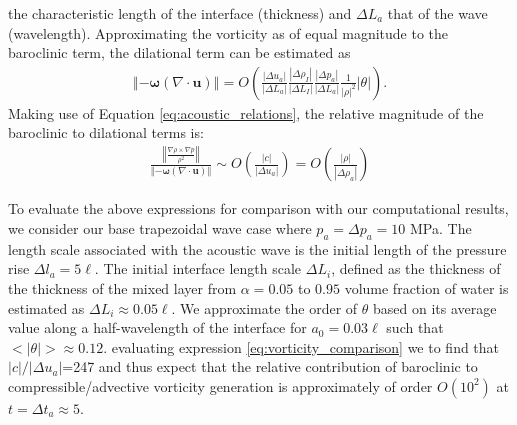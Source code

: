 \documentclass{jfm}%
\newcommand{\orderof}[1]{\ensuremath{\textit{O}\left(#1\right)}}
\newcommand{\abs}[1]{\ensuremath{\left|#1\right|}}
\newcommand{\norm}[1]{\ensuremath{\left\Vert#1\right\Vert}}
\begin{document}
the characteristic length of the interface (thickness) and
$\Delta L_a$ that of the wave (wavelength). Approximating the
vorticity as of equal magnitude to the baroclinic term, the dilational
term can be estimated as
\begin{align}
  \label{eq:compressible_advective_vorticity}%
  \norm{-\boldsymbol{\omega}\left(\nabla\cdot\boldsymbol{u}\right)} = %
  \orderof{%
  \frac{\abs{\Delta u_a}}{\abs{\Delta L_a}} \frac{\abs{\Delta \rho_I}}{\abs{\Delta L_I}}%
  \frac{\abs{\Delta p_a}}{\abs{\Delta L_a}} \frac{1}{\abs{\rho}^2}\abs{\theta}%
  }.%
\end{align}
%
Making use of Equation \eqref{eq:acoustic_relations}, the relative magnitude of the baroclinic to dilational terms is:
\begin{align} \label{eq:vorticity_comparison}
  \frac{\norm{\frac{\nabla\rho\times\nabla
  p}{\rho^2}}}{\norm{-\boldsymbol{\omega}\left(\nabla\cdot\boldsymbol{u}\right)}}
  \sim \orderof{\frac{\abs{c}}{\abs{\Delta u_a}}} = \orderof{\frac{\abs{\rho}}{\abs{\Delta \rho_a}}}%
\end{align}

To evaluate the above expressions for comparison with our
computational results, we consider our base trapezoidal wave case
where $p_a = \Delta p_a = 10$ MPa. The length scale associated with
the acoustic wave is the initial length of the pressure rise
$\Delta l_a=5\ell$. The initial interface length scale $\Delta L_i$,
defined as the thickness of the thickness of the mixed layer from
$\alpha=0.05$ to $0.95$ volume fraction of water is estimated as
$\Delta L_i \approx 0.05\ell$. We approximate the order of $\theta$
based on its average value along a half-wavelength of the interface
for $a_0=0.03\ell$ such that $<\abs{\theta}>\approx0.12$. evaluating
expression \eqref{eq:vorticity_comparison} we to find that
$\abs{c}/\abs{\Delta u_a}$=247 and thus expect that the relative
contribution of baroclinic to compressible/advective vorticity
generation is approximately of order $\orderof{10^2}$ at
$t = \Delta t_a \approx 5$.
\end{document}
